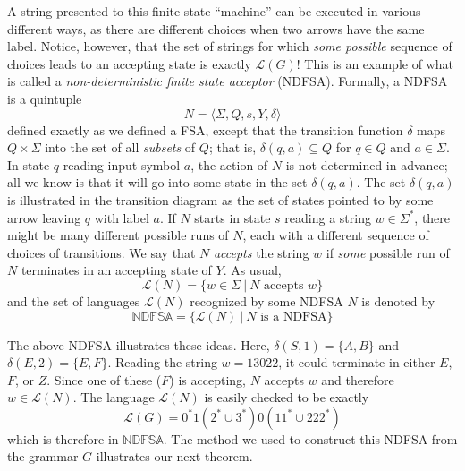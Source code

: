 \documentclass{article}
\newcommand{\El}{\mathcal L}
\begin{document}
A string presented to this finite state ``machine'' can be executed in various different ways, as there are different choices when two arrows have the same label. Notice, however, that the set of strings for which \emph{some possible} sequence of choices leads to an accepting state is exactly $\El(G)$! This is an example of what is called a \emph{non-deterministic finite state acceptor} (NDFSA). Formally, a NDFSA is a quintuple
\begin{equation*}
N = \langle \Sigma, Q, s, Y, \delta \rangle
\end{equation*}
defined exactly as we defined a FSA, except that the transition function $\delta$ maps $Q \times \Sigma$ into the set of all \emph{subsets} of $Q$; that is, $\delta(q,a)\subseteq Q$ for $q \in Q$ and $a \in \Sigma$. In state $q$ reading input symbol $a$, the action of $N$ is not determined in advance; all we know is that it will go into some state in the set $\delta(q,a)$. The set $\delta(q,a)$ is illustrated in the transition diagram as the set of states pointed to by some arrow leaving $q$ with label $a$. If $N$ starts in state $s$ reading a string $w \in \Sigma^*$, there might be many different possible runs of $N$, each with a different sequence of choices of transitions. We say that $N$ \emph{accepts} the string $w$ if \emph{some} possible run of $N$ terminates in an accepting state of $Y$. As usual,
\begin{equation*}
\El(N) = \{ w \in \Sigma\ |\ N \text{ accepts } w \}
\end{equation*}
and the set of languages $\El(N)$ recognized by some NDFSA $N$ is denoted by
\begin{equation*}
\mathbb{NDFSA} = \{ \El(N)\ |\ N \text{ is a NDFSA} \}
\end{equation*}

The above NDFSA illustrates these ideas. Here, $\delta(S,1) = \{A,B\}$ and $\delta(E,2) = \{E,F\}$. Reading the string $w = 13022$, it could terminate in either $E$, $F$, or $Z$. Since one of these ($F$) is accepting, $N$ accepts $w$ and therefore $w \in \El(N)$. The language $\El(N)$ is easily checked to be exactly
\begin{equation*}
\El(G) = 0^* 1 (2^* \cup 3^*) 0 (11^* \cup 222^*)
\end{equation*}
which is therefore in $\mathbb{NDFSA}$. The method we used to construct this NDFSA from the grammar $G$ illustrates our next theorem.
\end{document}
